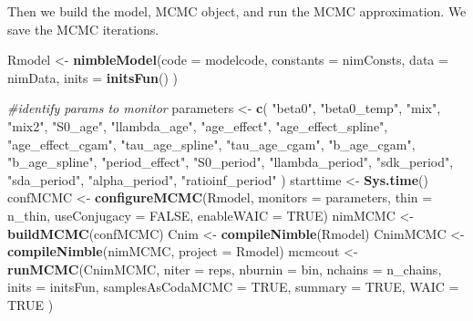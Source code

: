 \documentclass[11pt,]{article}
\newenvironment{Shaded}{\begin{snugshade}}{\end{snugshade}}
\newcommand{\KeywordTok}[1]{\textcolor[rgb]{0.13,0.29,0.53}{\textbf{#1}}}
\newcommand{\DataTypeTok}[1]{\textcolor[rgb]{0.13,0.29,0.53}{#1}}
\newcommand{\StringTok}[1]{\textcolor[rgb]{0.31,0.60,0.02}{#1}}
\newcommand{\CommentTok}[1]{\textcolor[rgb]{0.56,0.35,0.01}{\textit{#1}}}
\newcommand{\OtherTok}[1]{\textcolor[rgb]{0.56,0.35,0.01}{#1}}
\newcommand{\NormalTok}[1]{#1}
\begin{document}
Then we build the model, MCMC object, and run the MCMC approximation. We
save the MCMC iterations.

\begin{Shaded}
\begin{Highlighting}[]
\NormalTok{Rmodel <-}\StringTok{ }\KeywordTok{nimbleModel}\NormalTok{(}\DataTypeTok{code =}\NormalTok{ modelcode,}
                      \DataTypeTok{constants =}\NormalTok{ nimConsts,}
                      \DataTypeTok{data =}\NormalTok{ nimData,}
                      \DataTypeTok{inits =} \KeywordTok{initsFun}\NormalTok{()}
\NormalTok{                      )}

\CommentTok{#identify params to monitor}
\NormalTok{parameters <-}\StringTok{ }\KeywordTok{c}\NormalTok{(}
  \StringTok{"beta0"}\NormalTok{,}
  \StringTok{"beta0_temp"}\NormalTok{,}
  \StringTok{"mix"}\NormalTok{,}
  \StringTok{"mix2"}\NormalTok{,}
  \StringTok{"S0_age"}\NormalTok{,}
  \StringTok{"llambda_age"}\NormalTok{,}
  \StringTok{"age_effect"}\NormalTok{,}
  \StringTok{"age_effect_spline"}\NormalTok{,}
  \StringTok{"age_effect_cgam"}\NormalTok{,}
  \StringTok{"tau_age_spline"}\NormalTok{,}
  \StringTok{"tau_age_cgam"}\NormalTok{,}
  \StringTok{"b_age_cgam"}\NormalTok{,}
  \StringTok{"b_age_spline"}\NormalTok{,}
  \StringTok{"period_effect"}\NormalTok{,}
  \StringTok{"S0_period"}\NormalTok{,}
  \StringTok{"llambda_period"}\NormalTok{,}
  \StringTok{"sdk_period"}\NormalTok{,}
  \StringTok{"sda_period"}\NormalTok{,}
  \StringTok{"alpha_period"}\NormalTok{,}
  \StringTok{"ratioinf_period"}
\NormalTok{)}
\NormalTok{starttime <-}\StringTok{ }\KeywordTok{Sys.time}\NormalTok{()}
\NormalTok{confMCMC <-}\StringTok{ }\KeywordTok{configureMCMC}\NormalTok{(Rmodel,}
                          \DataTypeTok{monitors =}\NormalTok{ parameters,}
                          \DataTypeTok{thin =}\NormalTok{ n_thin,}
                          \DataTypeTok{useConjugacy =} \OtherTok{FALSE}\NormalTok{,}
                          \DataTypeTok{enableWAIC =} \OtherTok{TRUE}\NormalTok{)}
\NormalTok{nimMCMC <-}\StringTok{ }\KeywordTok{buildMCMC}\NormalTok{(confMCMC)}
\NormalTok{Cnim <-}\StringTok{ }\KeywordTok{compileNimble}\NormalTok{(Rmodel)}
\NormalTok{CnimMCMC <-}\StringTok{ }\KeywordTok{compileNimble}\NormalTok{(nimMCMC,}
                          \DataTypeTok{project =}\NormalTok{ Rmodel)}
\NormalTok{mcmcout <-}\StringTok{ }\KeywordTok{runMCMC}\NormalTok{(CnimMCMC,}
                   \DataTypeTok{niter =}\NormalTok{ reps,}
                   \DataTypeTok{nburnin =}\NormalTok{ bin,}
                   \DataTypeTok{nchains =}\NormalTok{ n_chains,}
                   \DataTypeTok{inits =}\NormalTok{ initsFun,}
                   \DataTypeTok{samplesAsCodaMCMC =} \OtherTok{TRUE}\NormalTok{,}
                   \DataTypeTok{summary =} \OtherTok{TRUE}\NormalTok{,}
                   \DataTypeTok{WAIC =} \OtherTok{TRUE}
\NormalTok{                   )}


\end{Highlighting}
\end{Shaded}
\end{document}

